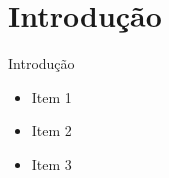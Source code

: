 \AtBeginSection[]{
	\begin{frame}
		\frametitle{}
		\tableofcontents[currentsection]
	\end{frame}
}

\section{Introdução}
\begin{frame}{Introdução}
	\begin{itemize}[<+->]
		\item Item 1
		\item Item 2
		\item Item 3
	\end{itemize}
\end{frame}